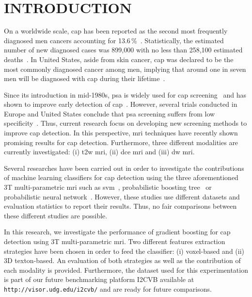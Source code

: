 \section{INTRODUCTION}\label{sec:introduction}

On a worldwide scale, \ac{cap} has been reported as the second most frequently diagnosed men cancers accounting for 13.6\,\%~\cite{Ferlay2010}. Statistically, the estimated number of new diagnosed cases was 899,000 with no less than 258,100 estimated deaths~\cite{Ferlay2010}. In United States, aside from skin cancer, \ac{cap} was declared to be the most commonly diagnosed cancer among men, implying that around one in seven men will be diagnosed with \ac{cap} during their lifetime~\cite{Siegel2014}.

Since its introduction in mid-1980s, \ac{psa} is widely used for \ac{cap} screening~\cite{Etzioni2002} and has shown to improve early detection of \ac{cap}~\cite{Chou2011}. However, several trials conducted in Europe and United States conclude that \ac{psa} screening suffers from low specificity~\cite{Andriole2009,Hugosson2010,Schroeder2012}. Thus, current research focus on developing new screening methods to improve \ac{cap} detection. In this perspective, \Ac{mri} techniques have recently shown promising results for \ac{cap} detection. Furthermore, three different modalities are currently investigated: (i) \ac{t2w} \ac{mri}, (ii) \ac{dce} \ac{mri} and (iii) \ac{dw} \ac{mri}.

Several researches have been carried out in order to investigate the contributions of machine learning classifiers for \ac{cap} detection using the three aforementioned 3T multi-parametric \ac{mri} such as \ac{svm}~\cite{Litjens2011,Litjens2012a,Litjens2014,Liu2013,Peng2013}, probabilistic boosting tree~\cite{Viswanath2011} or probabilistic neural network~\cite{Viswanath2011}. However, these studies use different datasets and evaluation statistics to report their results. Thus, no fair comparisons between these different studies are possible.

In this research, we investigate the performance of gradient boosting for \ac{cap} detection using 3T multi-parametric \ac{mri}. Two different features extraction strategies have been chosen in order to feed the classifier: (i) voxel-based and (ii) 3D texton-based. An evaluation of both strategies as well as the contribution of each modality is provided. Furthermore, the dataset used for this experimentation is part of our future benchmarking platform I2CVB available at {\tt http://visor.udg.edu/i2cvb/} and are ready for future comparisons.

